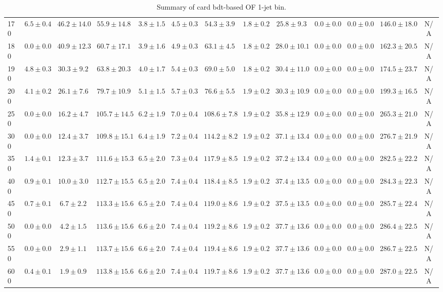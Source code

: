 \begin{table}
{\begin{center}
\begin{tabular}{l | c c | c c c c c c c c  | c c}
170 & $6.5\pm0.4$ & $46.2\pm14.0$ & $55.9\pm14.8$ & $3.8\pm1.5$ & $4.5\pm0.3$ & $54.3\pm3.9$ & $1.8\pm0.2$ & $25.8\pm9.3$ & $0.0\pm0.0$ & $0.0\pm0.0$ & $146.0\pm18.0$ & N/A \\
180 & $0.0\pm0.0$ & $40.9\pm12.3$ & $60.7\pm17.1$ & $3.9\pm1.6$ & $4.9\pm0.3$ & $63.1\pm4.5$ & $1.8\pm0.2$ & $28.0\pm10.1$ & $0.0\pm0.0$ & $0.0\pm0.0$ & $162.3\pm20.5$ & N/A \\
190 & $4.8\pm0.3$ & $30.3\pm9.2$ & $63.8\pm20.3$ & $4.0\pm1.7$ & $5.4\pm0.3$ & $69.0\pm5.0$ & $1.8\pm0.2$ & $30.4\pm11.0$ & $0.0\pm0.0$ & $0.0\pm0.0$ & $174.5\pm23.7$ & N/A \\
200 & $4.1\pm0.2$ & $26.1\pm7.6$ & $79.7\pm10.9$ & $5.1\pm1.5$ & $5.7\pm0.3$ & $76.6\pm5.5$ & $1.9\pm0.2$ & $30.3\pm10.9$ & $0.0\pm0.0$ & $0.0\pm0.0$ & $199.3\pm16.5$ & N/A \\
250 & $0.0\pm0.0$ & $16.2\pm4.7$ & $105.7\pm14.5$ & $6.2\pm1.9$ & $7.0\pm0.4$ & $108.6\pm7.8$ & $1.9\pm0.2$ & $35.8\pm12.9$ & $0.0\pm0.0$ & $0.0\pm0.0$ & $265.3\pm21.0$ & N/A \\
300 & $0.0\pm0.0$ & $12.4\pm3.7$ & $109.8\pm15.1$ & $6.4\pm1.9$ & $7.2\pm0.4$ & $114.2\pm8.2$ & $1.9\pm0.2$ & $37.1\pm13.4$ & $0.0\pm0.0$ & $0.0\pm0.0$ & $276.7\pm21.9$ & N/A \\
350 & $1.4\pm0.1$ & $12.3\pm3.7$ & $111.6\pm15.3$ & $6.5\pm2.0$ & $7.3\pm0.4$ & $117.9\pm8.5$ & $1.9\pm0.2$ & $37.2\pm13.4$ & $0.0\pm0.0$ & $0.0\pm0.0$ & $282.5\pm22.2$ & N/A \\
400 & $0.9\pm0.1$ & $10.0\pm3.0$ & $112.7\pm15.5$ & $6.5\pm2.0$ & $7.4\pm0.4$ & $118.4\pm8.5$ & $1.9\pm0.2$ & $37.4\pm13.5$ & $0.0\pm0.0$ & $0.0\pm0.0$ & $284.3\pm22.3$ & N/A \\
450 & $0.7\pm0.1$ & $6.7\pm2.2$ & $113.3\pm15.6$ & $6.5\pm2.0$ & $7.4\pm0.4$ & $119.0\pm8.6$ & $1.9\pm0.2$ & $37.5\pm13.5$ & $0.0\pm0.0$ & $0.0\pm0.0$ & $285.7\pm22.4$ & N/A \\
500 & $0.0\pm0.0$ & $4.2\pm1.5$ & $113.6\pm15.6$ & $6.6\pm2.0$ & $7.4\pm0.4$ & $119.2\pm8.6$ & $1.9\pm0.2$ & $37.7\pm13.6$ & $0.0\pm0.0$ & $0.0\pm0.0$ & $286.4\pm22.5$ & N/A \\
550 & $0.0\pm0.0$ & $2.9\pm1.1$ & $113.7\pm15.6$ & $6.6\pm2.0$ & $7.4\pm0.4$ & $119.4\pm8.6$ & $1.9\pm0.2$ & $37.7\pm13.6$ & $0.0\pm0.0$ & $0.0\pm0.0$ & $286.7\pm22.5$ & N/A \\
600 & $0.4\pm0.1$ & $1.9\pm0.9$ & $113.8\pm15.6$ & $6.6\pm2.0$ & $7.4\pm0.4$ & $119.7\pm8.6$ & $1.9\pm0.2$ & $37.7\pm13.6$ & $0.0\pm0.0$ & $0.0\pm0.0$ & $287.0\pm22.5$ & N/A \\
\hline
\end{tabular}
\end{center}
}
\caption{Summary of card bdt-based OF 1-jet bin.}
\end{table}
